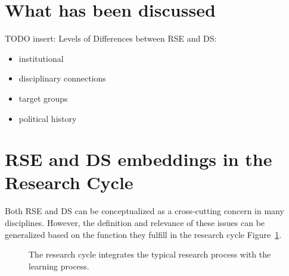 \documentclass[
        english,biblatex
    ]{lni}
\providecommand{\tightlist}{%
    \setlength{\itemsep}{0pt}\setlength{\parskip}{0pt}}
\begin{document}
    \section{What has been discussed}\label{what-has-been-discussed}

    TODO insert: Levels of Differences between RSE and DS:

    \begin{itemize}
    \tightlist
    \item
      institutional
    \item
      disciplinary connections
    \item
      target groups
    \item
      political history
    \end{itemize}

    \section{RSE and DS embeddings in the Research
    Cycle}\label{rse-and-ds-embeddings-in-the-research-cycle}

    Both RSE and DS can be conceptualized as a cross-cutting concern in
    many disciplines. However, the definition and relevance of these
    issues can be generalized based on the function they fulfill in the
    research cycle Figure~\ref{fig-research_cycle}.

    \newpage

    \begin{figure}


    \caption{\label{fig-research_cycle}The research cycle
    \autocite{wildt2009forschendes} integrates the typical research
    process with the learning process.}

    \end{figure}%
\end{document}
